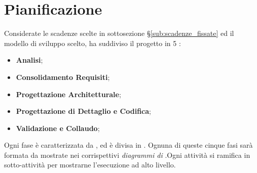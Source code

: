 \section{Pianificazione}
Considerate le scadenze scelte in sottosezione \S\ref{sub:scadenze_fissate} ed il modello di sviluppo scelto, {\Gruppo} ha suddiviso il progetto in 5 :
\begin{itemize}
    \item \textbf{Analisi};
    \item \textbf{Consolidamento Requisiti};
    \item \textbf{Progettazione Architetturale};
    \item \textbf{Progettazione di Dettaglio e Codifica};
    \item \textbf{Validazione e Collaudo};
\end{itemize}
 Ogni fase è caratterizzata da ,  ed è divisa in . Ognuna di queste cinque fasi sarà formata da  mostrate nei corrispettivi \textit{diagrammi di }.Ogni attività si ramifica in sotto-attività per mostrarne l'esecuzione ad alto livello.


\newpage

\newpage

\newpage

\newpage

\newpage
